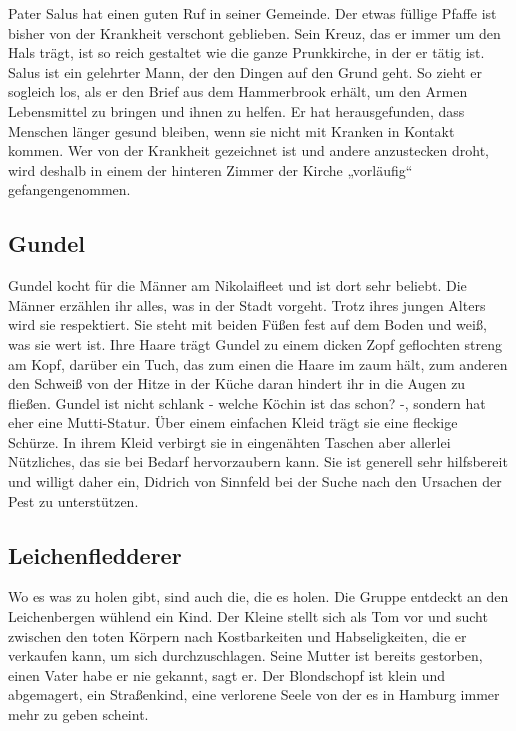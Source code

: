 Pater Salus hat einen guten Ruf in seiner Gemeinde. Der etwas füllige Pfaffe ist bisher von der Krankheit verschont geblieben. Sein Kreuz, das er immer um den Hals trägt, ist so reich gestaltet wie die ganze Prunkkirche, in der er tätig ist. Salus ist ein gelehrter Mann, der den Dingen auf den Grund geht. So zieht er sogleich los, als er den Brief aus dem Hammerbrook erhält, um den Armen Lebensmittel zu bringen und ihnen zu helfen. Er hat herausgefunden, dass Menschen länger gesund bleiben, wenn sie nicht mit Kranken in Kontakt kommen. Wer von der Krankheit gezeichnet ist und andere anzustecken droht, wird deshalb in einem der hinteren Zimmer der Kirche „vorläufig“ gefangengenommen.

\subsection{Gundel}

Gundel kocht für die Männer am Nikolaifleet und ist dort sehr beliebt. Die Männer erzählen ihr alles, was in der Stadt vorgeht. Trotz ihres jungen Alters wird sie respektiert. Sie steht mit beiden Füßen fest auf dem Boden und weiß, was sie wert ist. Ihre Haare trägt Gundel zu einem dicken Zopf geflochten streng am Kopf, darüber ein Tuch, das zum einen die Haare im zaum hält, zum anderen den Schweiß von der Hitze in der Küche daran hindert ihr in die Augen zu fließen. Gundel ist nicht schlank - welche Köchin ist das schon? -, sondern hat eher eine Mutti-Statur. Über einem einfachen Kleid trägt sie eine fleckige Schürze. In ihrem Kleid verbirgt sie in eingenähten Taschen aber allerlei Nützliches, das sie bei Bedarf hervorzaubern kann. Sie ist generell sehr hilfsbereit und willigt daher ein, Didrich von Sinnfeld bei der Suche nach den Ursachen der Pest zu unterstützen.

\subsection{Leichenfledderer}

Wo es was zu holen gibt, sind auch die, die es holen. Die Gruppe entdeckt an den Leichenbergen wühlend ein Kind. Der Kleine stellt sich als Tom vor und sucht zwischen den toten Körpern nach Kostbarkeiten und Habseligkeiten, die er verkaufen kann, um sich durchzuschlagen. Seine Mutter ist bereits gestorben, einen Vater habe er nie gekannt, sagt er. Der Blondschopf ist klein und abgemagert, ein Straßenkind, eine verlorene Seele von der es in Hamburg immer mehr zu geben scheint.

